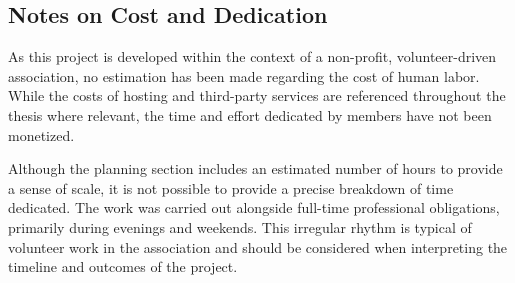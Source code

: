 \subsection*{Notes on Cost and Dedication}

As this project is developed within the context of a non-profit, volunteer-driven association, no estimation has been made regarding the cost of human labor. While the costs of hosting and third-party services are referenced throughout the thesis where relevant, the time and effort dedicated by members have not been monetized.

Although the planning section includes an estimated number of hours to provide a sense of scale, it is not possible to provide a precise breakdown of time dedicated. The work was carried out alongside full-time professional obligations, primarily during evenings and weekends. This irregular rhythm is typical of volunteer work in the association and should be considered when interpreting the timeline and outcomes of the project.